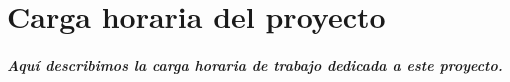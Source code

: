 \chapter{Carga horaria del proyecto}\label{cargahoraria}

\paragraph{Aqu\'i describimos la carga horaria de trabajo dedicada a este proyecto.}